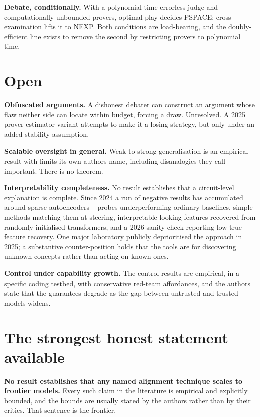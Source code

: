 \textbf{Debate, conditionally.} With a polynomial-time errorless judge and computationally unbounded provers, optimal play decides PSPACE; cross-examination lifts it to NEXP. Both conditions are load-bearing, and the doubly-efficient line exists to remove the second by restricting provers to polynomial time.

\section*{Open}

\textbf{Obfuscated arguments.} A dishonest debater can construct an argument whose flaw neither side can locate within budget, forcing a draw. Unresolved. A 2025 prover-estimator variant attempts to make it a losing strategy, but only under an added stability assumption.

\textbf{Scalable oversight in general.} Weak-to-strong generalisation is an empirical result with limits its own authors name, including disanalogies they call important. There is no theorem.

\textbf{Interpretability completeness.} No result establishes that a circuit-level explanation is complete. Since 2024 a run of negative results has accumulated around sparse autoencoders -- probes underperforming ordinary baselines, simple methods matching them at steering, interpretable-looking features recovered from randomly initialised transformers, and a 2026 sanity check reporting low true-feature recovery. One major laboratory publicly deprioritised the approach in 2025; a substantive counter-position holds that the tools are for discovering unknown concepts rather than acting on known ones.

\textbf{Control under capability growth.} The control results are empirical, in a specific coding testbed, with conservative red-team affordances, and the authors state that the guarantees degrade as the gap between untrusted and trusted models widens.

\section*{The strongest honest statement available}

\textbf{No result establishes that any named alignment technique scales to frontier models.} Every such claim in the literature is empirical and explicitly bounded, and the bounds are usually stated by the authors rather than by their critics. That sentence is the frontier.

